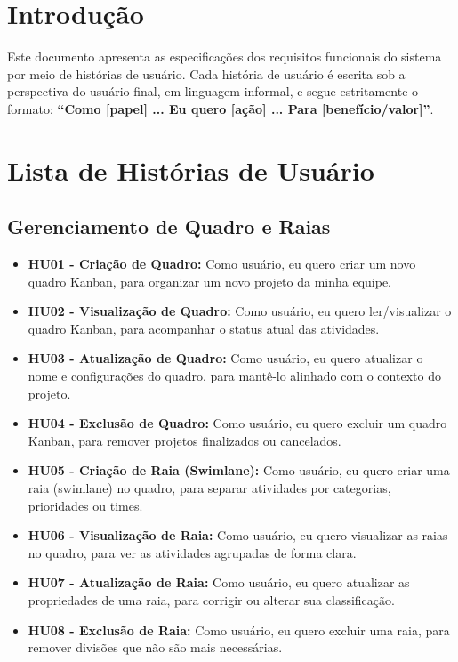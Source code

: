 \section{Introdução}
Este documento apresenta as especificações dos requisitos 
funcionais do sistema por meio de histórias de usuário. 
Cada história de usuário é escrita sob a perspectiva do usuário final,
em linguagem informal, e segue estritamente o formato: 
\textbf{``Como [papel] ... Eu quero [ação] ... Para [benefício/valor]''}.

\section{Lista de Histórias de Usuário}

\subsection{Gerenciamento de Quadro e Raias}
\begin{itemize}
    \item \textbf{HU01 - Criação de Quadro:} Como usuário, eu quero criar um novo 
    quadro Kanban, para organizar um novo projeto da minha equipe.
    \item \textbf{HU02 - Visualização de Quadro:} Como usuário, eu quero ler/visualizar
    o quadro Kanban, para acompanhar o status atual das atividades.
    \item \textbf{HU03 - Atualização de Quadro:} Como usuário, eu quero atualizar 
    o nome e configurações do quadro, para mantê-lo alinhado com o contexto do 
    projeto.
    \item \textbf{HU04 - Exclusão de Quadro:} Como usuário, eu quero excluir um 
    quadro Kanban, para remover projetos finalizados ou cancelados.
    
    \item \textbf{HU05 - Criação de Raia (Swimlane):} Como usuário, eu quero criar 
    uma raia (swimlane) no quadro, para separar atividades por categorias, 
    prioridades ou times.
    \item \textbf{HU06 - Visualização de Raia:} Como usuário, eu quero visualizar 
    as raias no quadro, para ver as atividades agrupadas de forma clara.
    \item \textbf{HU07 - Atualização de Raia:} Como usuário, eu quero atualizar as 
    propriedades de uma raia, para corrigir ou alterar sua classificação.
    \item \textbf{HU08 - Exclusão de Raia:} Como usuário, eu quero excluir uma raia, 
    para remover divisões que não são mais necessárias.
\end{itemize}

